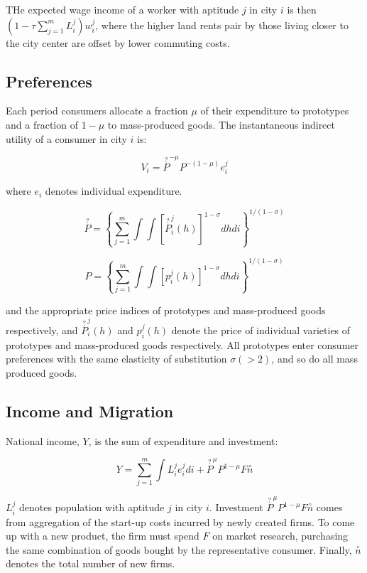 THe expected wage income of a worker with aptitude $j$ in city $i$ is then $(1 - \tau \sum_{j=1}^m L_i^j)w_i^j$, where the higher land rents pair by those living closer to the city center are offset by lower commuting costs.

\subsection{Preferences}

Each period consumers allocate a fraction $\mu$ of their expenditure to prototypes and a fraction of $1 - \mu$ to mass-produced goods. The instantaneous indirect utility of a consumer in city $i$ is:

\begin{equation}
  V_i = \overset{?}{P}^{-\mu} P^{-(1 - \mu)}e_i^j 
\end{equation}

where $e_i$ denotes individual expenditure.

\begin{equation}
  \overset{?}{P} = \left\{ \sum_{j=1}^m \int \int [\overset{?}{P}_i^j (h)]^{1 - \sigma} dh di \right\}^{1/(1 - \sigma)} 
\end{equation}

\begin{equation}
  P = \left\{ \sum_{j=1}^m \int \int [p_i^j (h)]^{1 - \sigma} dh di \right\}^{1/(1 - \sigma)} 
\end{equation}

and the appropriate price indices of prototypes and mass-produced goods respectively, and $\overset{?}{P}_i^j(h)$ and $p_i^j(h)$ denote the price of individual varieties of prototypes and mass-produced goods respectively. All prototypes enter consumer preferences with the same elasticity of substitution $\sigma (> 2)$, and so do all mass produced goods.

\subsection{Income and Migration}

National income, $Y$, is the sum of expenditure and investment:

\begin{equation}
  Y = \sum_{j=1}^m \int L_i^j e_i^j di + \overset{?}{P}^{\mu} P^{1 - \mu} F \overset{\circ}{n}
\end{equation}

$L_i^j$ denotes population with aptitude $j$ in city $i$. Investment $\overset{?}{P}^{\mu} P^{1 - \mu}F\overset{\circ}{n}$ comes from aggregation of the start-up costs incurred by newly created firms. To come up with a new product, the firm must spend $F$ on market research, purchasing the same combination of goods bought by the representative consumer. Finally, $\overset{\circ}{n}$ denotes the total number of new firms.

